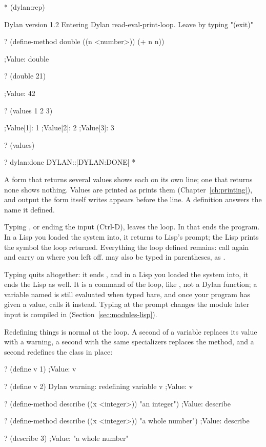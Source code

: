 \begin{repl}
* (dylan:rep)

Dylan version 1.2
Entering Dylan read-eval-print-loop.
Leave by typing "(exit)"

? (define-method double ((n <number>)) (+ n n))

;Value: double

? (double 21)

;Value: 42

? (values 1 2 3)

;Value[1]: 1
;Value[2]: 2
;Value[3]: 3

? (values)


? dylan:done
DYLAN::|DYLAN:DONE|
*
\end{repl}

\noindent
A form that returns several values shows each on its own
 line; one that returns none shows nothing.
Values are printed as  prints them (Chapter~\ref{ch:printing}),
and output the form itself writes appears before the  line.
A definition answers the name it defined.

Typing , or ending the input (Ctrl-D), leaves the
loop. In  that ends the program. In a Lisp you loaded
the system into, it returns to Lisp's \code{*} prompt; the Lisp prints
the symbol the loop returned. Everything the loop defined remains: call
 again and carry on where you left off. 
may also be typed in parentheses, as .

Typing  quits altogether: it ends , and in a
Lisp you loaded the system into, it ends the Lisp as well. It is a command
of the loop, like , not a Dylan function; a variable
named  is still evaluated when typed bare, and once your program
has given  a value,  calls it instead. Typing  at the
 prompt changes the module later input is compiled in
(Section~\ref{sec:modules-lisp}).

Redefining things is normal at the loop. A second  of a
variable replaces its value with a warning, a second 
with the same specializers replaces the method, and a second
 redefines the class in place:

\begin{repl}
? (define v 1)
;Value: v

? (define v 2)
Dylan warning: redefining variable v
;Value: v

? (define-method describe ((x <integer>)) "an integer")
;Value: describe

? (define-method describe ((x <integer>)) "a whole number")
;Value: describe

? (describe 3)
;Value: "a whole number"
\end{repl}

